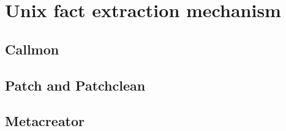 \section{Unix fact extraction mechanism}

\subsection{Callmon} 
\subsection{Patch and Patchclean} 
\subsection{Metacreator} 
